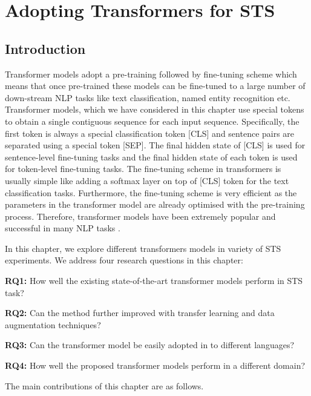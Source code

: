 \chapter{\label{cha:sts_transformers}Adopting Transformers for STS}

\section{Introduction}




Transformer models adopt a pre-training followed by fine-tuning scheme which means that once pre-trained these models can be fine-tuned to a large number of down-stream NLP tasks like text classification, named entity recognition etc.  Transformer models, which we have considered in this chapter use special tokens to obtain a single contiguous sequence for each input sequence. Specifically, the first token is always a special classification token \textsc{[CLS]} and sentence pairs are separated using a special token \textsc{[SEP]}. The final hidden state of \textsc{[CLS]}  is used for sentence-level fine-tuning tasks and the final hidden state of each token is used for token-level fine-tuning tasks. The fine-tuning scheme in transformers is usually simple like adding a softmax layer on top of \textsc{[CLS]} token for the text classification tasks. Furthermore, the fine-tuning scheme is very efficient as the parameters in the transformer model are already optimised with the pre-training process. Therefore, transformer models have been extremely popular and successful in many NLP tasks \cite{devlin-etal-2019-bert}. 

In this chapter, we explore different transformers models in variety of STS experiments. 
We address four research questions in this chapter:

\textbf{RQ1:} How well the existing state-of-the-art transformer models perform in STS task? 

\textbf{RQ2:} Can the method further improved with transfer learning and data augmentation techniques?

\textbf{RQ3:} Can the transformer model be easily adopted in to different languages?

\textbf{RQ4:} How well the proposed transformer models perform in a different domain? 

The main contributions of this chapter are as follows.

